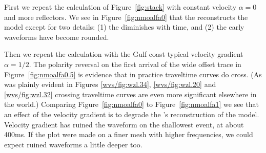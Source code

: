 First we repeat the calculation of Figure~\ref{fig:stack}
with constant velocity $\alpha=0$ and more reflectors.
We see in Figure~\ref{fig:nmoalfa0} that the  reconstructs
the model except for two details:
(1) the  diminishes with time, and 
(2) the early waveforms have become rounded.


Then we repeat the calculation
with the Gulf coast typical velocity gradient $\alpha=1/2$.
The polarity reversal on the first arrival of the wide offset trace
in Figure~\ref{fig:nmoalfa0.5}
is evidence that in practice traveltime curves do cross.
(As was plainly evident in Figures
\ref{wvs/fig:wzl.34},
\ref{wvs/fig:wzl.20} and
\ref{wvs/fig:wzl.32}
crossing traveltime curves are even more significant elsewhere in the world.)
Comparing Figure~\ref{fig:nmoalfa0} to Figure~\ref{fig:nmoalfa1}
we see that an effect of the velocity gradient
is to degrade the 's reconstruction of the model.
Velocity gradient has ruined the waveform on the shallowest event,
at about 400ms.
If the plot were made on a finer mesh
with higher frequencies,
we could expect ruined waveforms a little deeper too.



